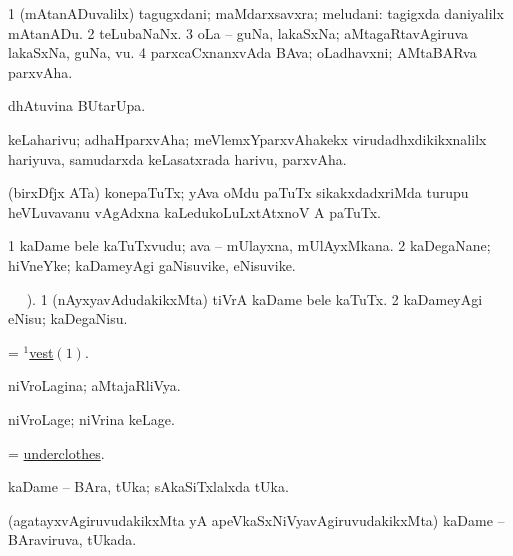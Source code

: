 \bentry
{} 
\gl{\nA}
\expl{}
\bmng
\bnum
\num{1} (mAtanADuvalilx) tagugxdani; maMdarxsavxra; meludani:  tagigxda daniyalilx mAtanADu. 
\num{2} teLubaNaNx. 
\num{3} oLa -- guNa, lakaSxNa; aMtagaRtavAgiruva lakaSxNa, guNa, \mo vu. 
\num{4} parxcaCxnanxvAda BAva; oLadhavxni; AMtaBARva parxvAha. 
\enum
\emng
\eentry

\bentry
{} 
\gl{\sakirx}
\expl{}
\bmng
  dhAtuvina BUtarUpa. 
\emng
\eentry

\bentry
{} 
\gl{\nA}
\expl{}
\bmng
 keLaharivu; adhaHparxvAha; meVlemxYparxvAhakekx virudadhxdikikxnalilx hariyuva, samudarxda keLasatxrada harivu, parxvAha. 
\emng
\eentry

\bentry
{} 
\gl{\nA}
\expl{}
\bmng
 (birxDfjx ATa) konepaTuTx; yAva oMdu paTuTx sikakxdadxriMda turupu heVLuvavanu vAgAdxna kaLedukoLuLxtAtxnoV A paTuTx. 
\emng
\eentry

\bentry
{} 
\gl{\nA}
\expl{}
\bmng
\bnum
\num{1} kaDame bele kaTuTxvudu; ava -- mUlayxna, mUlAyxMkana. 
\num{2} kaDegaNane; hiVneYke; kaDameyAgi gaNisuvike, eNisuvike. 
\enum
\emng
\eentry

\bentry
{} 
\gl{\sakirx}
\BUkaq\  \vakaq\ ). \bmng
\bnum
\num{1} (nAyxyavAdudakikxMta) tiVrA kaDame bele kaTuTx. 
\num{2} kaDameyAgi eNisu; kaDegaNisu. 
\enum
\emng
\eentry

\bentry
{} 
\gl{\nA}
\expl{}
\bmng
 = \hyperref{kandict_v.pdf}{V}{vest(1)1}{$^1$vest\((1)\)}. 
\emng
\eentry

\bentry
{} 
\gl{\gu}
\expl{}
\bmng
 niVroLagina; aMtajaRliVya. 
\emng
\eentry

\bentry
{} 
\gl{\kirxvi}
\expl{}
\bmng
 niVroLage; niVrina keLage. 
\emng
\eentry

\bentry
{} 
\gl{\nA}
\expl{}
\bmng
 = \hyperlink{underclothes}{underclothes}. 
\emng
\eentry

\bentry
{} 
\gl{\nA}
\expl{}
\bmng
 kaDame -- BAra, tUka; sAkaSiTxlalxda tUka. 
\emng
\eentry

\bentry
{} 
\gl{\gu}
\expl{}
\bmng
 (agatayxvAgiruvudakikxMta yA apeVkaSxNiVyavAgiruvudakikxMta) kaDame -- BAraviruva, tUkada. 
\emng
\eentry

